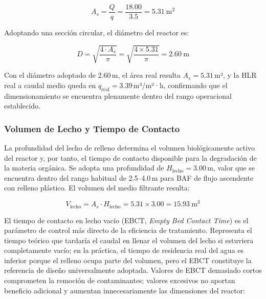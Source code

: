 \begin{equation}
A_{s} = \frac{Q}{q} = \frac{18.00}{3.5} = 5.31\ \text{m}^2
\end{equation}

Adoptando una sección circular, el diámetro del reactor es:

\begin{equation}
D = \sqrt{\frac{4 \cdot A_{s}}{\pi}} = \sqrt{\frac{4 \times 5.31}{\pi}} = 2.60\ \text{m}
\end{equation}

Con el diámetro adoptado de 2.60\,m, el área real resulta $A_{s} = 5.31$\,m², y la HLR real a caudal medio queda en $q_{\text{real}} = 3.39$\,m³/m²·h, confirmando que el dimensionamiento se encuentra plenamente dentro del rango operacional establecido.

\subsubsection*{Volumen de Lecho y Tiempo de Contacto}

La profundidad del lecho de relleno determina el volumen biológicamente activo del reactor y, por tanto, el tiempo de contacto disponible para la degradación de la materia orgánica. Se adopta una profundidad de $H_{\text{lecho}} = 3.00$\,m, valor que se encuentra dentro del rango habitual de 2.5--4.0\,m para BAF de flujo ascendente con relleno plástico. El volumen del medio filtrante resulta:

\begin{equation}
V_{\text{lecho}} = A_{s} \cdot H_{\text{lecho}} = 5.31 \times 3.00 = 15.93\ \text{m}^3
\end{equation}

El tiempo de contacto en lecho vacío (EBCT, \textit{Empty Bed Contact Time}) es el parámetro de control más directo de la eficiencia de tratamiento. Representa el tiempo teórico que tardaría el caudal en llenar el volumen del lecho si estuviera completamente vacío; en la práctica, el tiempo de residencia real del agua es inferior porque el relleno ocupa parte del volumen, pero el EBCT constituye la referencia de diseño universalmente adoptada. Valores de EBCT demasiado cortos comprometen la remoción de contaminantes; valores excesivos no aportan beneficio adicional y aumentan innecesariamente las dimensiones del reactor:

